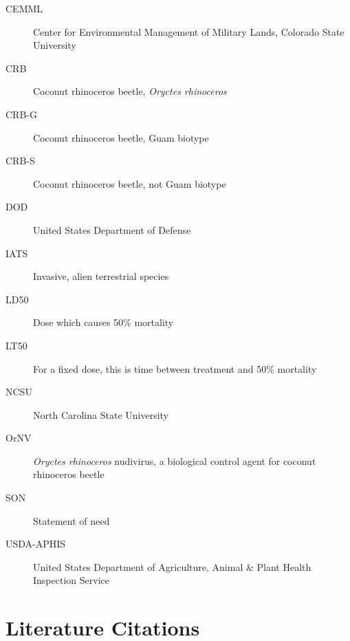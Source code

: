 \documentclass[11pt,english,letterpaper]{scrartcl}
\begin{document}
\begin{description}
	\item[CEMML] Center for Environmental Management of Military Lands, Colorado State University
	\item[CRB] Coconut rhinoceros beetle, \textit{Oryctes rhinoceros}
	\item[CRB-G] Coconut rhinoceros beetle, Guam biotype
	\item[CRB-S] Coconut rhinoceros beetle, not Guam biotype
	\item[DOD] United States Department of Defense
	\item[IATS] Invasive, alien terrestrial species
	\item[LD50] Dose which causes 50\% mortality
	\item[LT50] For a fixed dose, this is time between treatment and 50\% mortality
	\item[NCSU] North Carolina State University
	\item[OrNV] \textit{Oryctes rhinoceros} nudivirus, a biological control agent for coconut rhinoceros beetle
	\item[SON] Statement of need
	\item[USDA-APHIS] United States Department of Agriculture, Animal \& Plant Health Inspection Service
\end{description}

\clearpage

\section{Literature Citations}

\end{document}
